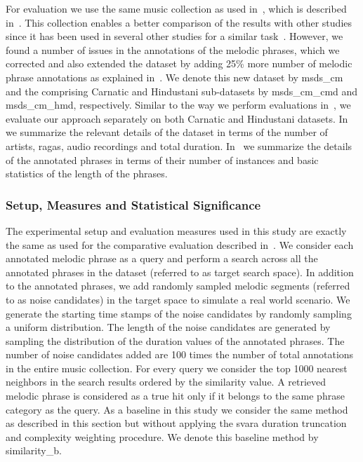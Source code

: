 For evaluation we use the same music collection as used in~, which is described in~. This collection enables a better comparison of the results with other studies since it has been used in several other studies for a similar task~\citep{Rao2014,Ross2012b}. However, we found a number of issues in the annotations of the melodic phrases, which we corrected and also extended the dataset by adding 25\% more number of melodic phrase annotations as explained in~. We denote this new dataset by \acrshort{msds_cm} and the comprising Carnatic and Hindustani sub-datasets by \acrshort{msds_cm_cmd} and \acrshort{msds_cm_hmd}, respectively. Similar to the way we perform evaluations in~, we evaluate our approach separately on both Carnatic and Hindustani datasets. In~ we summarize the relevant details of the dataset in terms of the number of artists, \glspl{raga}, audio recordings and total duration. In~ we summarize the details of the annotated phrases in terms of their number of instances and basic statistics of the length of the phrases.


\subsubsection{Setup, Measures and Statistical Significance}
\label{sec:patterns_improving_similarity_experimental_setup}

The experimental setup and evaluation measures used in this study are exactly the same as used for the comparative evaluation described in~. We consider each annotated melodic phrase as a query and perform a search across all the annotated phrases in the dataset (referred to as target search space). In addition to the annotated phrases, we add randomly sampled melodic segments (referred to as noise candidates) in the target space to simulate a real world scenario. We generate the starting time stamps of the noise candidates by randomly sampling a uniform distribution. The length of the noise candidates are generated by sampling the distribution of the duration values of the annotated phrases. The number of noise candidates added are 100 times the number of total annotations in the entire music collection. For every query we consider the top 1000 nearest neighbors in the search results ordered by the similarity value. A retrieved melodic phrase is considered as a true hit only if it belongs to the same phrase category as the query. As a baseline in this study we consider the same method as described in this section but without applying the \gls{svara} duration truncation and complexity weighting procedure. We denote this baseline method by \acrshort{similarity_b}.

